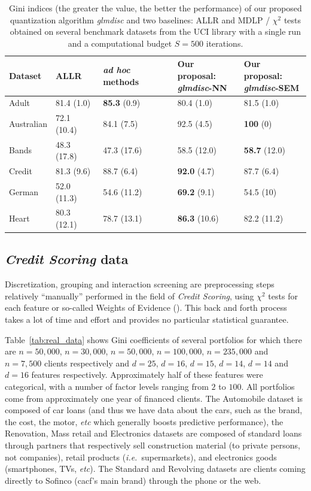 \begin{table}
    \centering
        \caption{Gini indices (the greater the value, the better the performance) of our proposed quantization algorithm \textit{glmdisc} and two baselines: ALLR and MDLP / $\chi^2$ tests obtained on several benchmark datasets from the UCI library with a single run and a computational budget $S = 500$ iterations.}
    \label{tab:banchmark}
\begin{small}
\begin{tabular}{lllll}
Dataset & ALLR & \textit{ad hoc} methods & \makecell{Our proposal:\\ \textit{glmdisc}-NN} & \makecell{Our proposal:\\ \textit{glmdisc}-SEM} \\
\hline
Adult & 81.4 (1.0) & \textbf{85.3} (0.9) & 80.4 (1.0) & 81.5 (1.0) \\
Australian & 72.1 (10.4) & 84.1 (7.5) & 92.5 (4.5) & \textbf{100} (0) \\
Bands & 48.3 (17.8) & 47.3 (17.6) & 58.5 (12.0) & \textbf{58.7} (12.0) \\
Credit & 81.3 (9.6) & 88.7 (6.4) & \textbf{92.0} (4.7) & 87.7 (6.4) \\
German & 52.0 (11.3) & 54.6 (11.2) & \textbf{69.2} (9.1) & 54.5 (10) \\
Heart & 80.3 (12.1) & 78.7 (13.1) & \textbf{86.3} (10.6) & 82.2 (11.2) 
\end{tabular}
\end{small}
\end{table}

\subsection{\textit{Credit Scoring} data} \label{subsec:exp_real}


Discretization, grouping and interaction screening are preprocessing steps relatively ``manually'' performed in the field of \textit{Credit Scoring}, using $\chi^2$ tests for each feature or so-called Weights of Evidence (\cite{zeng2014necessary}). This back and forth process takes a lot of time and effort and provides no particular statistical guarantee.

Table~\ref{tab:real_data} shows Gini coefficients of several portfolios for which there are $n=50,000$, $n=30,000$, $n=50,000$, $n=100,000$, $n=235,000$ and $n=7,500$ clients respectively and $d=25$, $d=16$, $d=15$, $d=14$, $d=14$ and $d=16$ features respectively. Approximately half of these features were categorical, with a number of factor levels ranging from $2$ to $100$. All portfolios come from approximately one year of financed clients. The Automobile dataset is composed of car loans (and thus we have data about the cars, such as the brand, the cost, the motor, \textit{etc} which generally boosts predictive performance), the Renovation, Mass retail and Electronics datasets are composed of standard loans through partners that respectively sell construction material (to private persons, not companies), retail products (\textit{i.e.}\ supermarkets), and electronics goods (smartphones, TVs, \textit{etc}). The Standard and Revolving datasets are clients coming directly to Sofinco (\gls{cacf}'s main brand) through the phone or the web.

